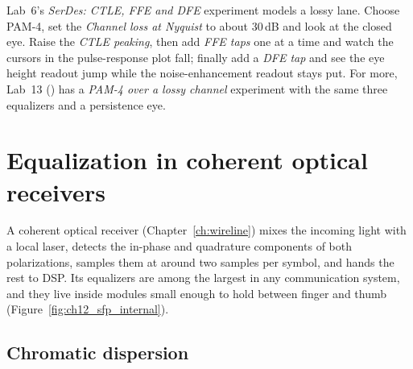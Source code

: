 \begin{tryit}
Lab~6's \emph{SerDes: CTLE, FFE and DFE} experiment models a lossy lane. Choose PAM-4, set the
\emph{Channel loss at Nyquist} to about 30\,dB and look at the closed eye. Raise the \emph{CTLE
peaking}, then add \emph{FFE taps} one at a time and watch the cursors in the pulse-response plot
fall; finally add a \emph{DFE tap} and see the eye height readout jump while the noise-enhancement
readout stays put. For more, Lab~13 () has a \emph{PAM-4 over a lossy
channel} experiment with the same three equalizers and a persistence eye.
\end{tryit}

\section{Equalization in coherent optical receivers}
\label{sec:ch12:optical}

A coherent optical receiver (Chapter~\ref{ch:wireline}) mixes the incoming light with a local laser,
detects the in-phase and quadrature components of both polarizations, samples them at around two
samples per symbol, and hands the rest to DSP. Its equalizers are among the largest in any
communication system, and they live inside modules small enough to hold between finger and thumb
(Figure~\ref{fig:ch12_sfp_internal}).


\subsection{Chromatic dispersion}

